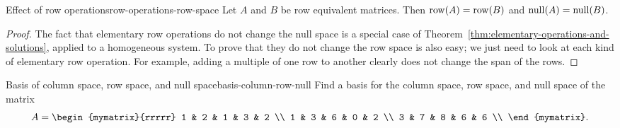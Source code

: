 \begin{proposition}{Effect of row operations}{row-operations-row-space}
  Let $A$ and $B$ be row equivalent matrices. Then $\row(A)=\row(B)$
  and $\nullspace(A)=\nullspace(B)$.
\end{proposition}

\begin{proof}
  The fact that elementary row operations do not change the null space
  is a special case of
  Theorem~\ref{thm:elementary-operations-and-solutions}, applied to a
  homogeneous system. To prove that they do not change the row space
  is also easy; we just need to look at each kind of elementary row
  operation. For example, adding a multiple of one row to another
  clearly does not change the span of the rows.
\end{proof}

\begin{example}{Basis of column space, row space, and null space}{basis-column-row-null}
  Find a basis for the column space, row space, and null space of the
  matrix
  \begin{equation*}
    A =
    \begin{mymatrix}{rrrrr}
      1 & 2 & 1 & 3 & 2 \\
      1 & 3 & 6 & 0 & 2 \\
      3 & 7 & 8 & 6 & 6 \\
    \end{mymatrix}.
  \end{equation*}
\end{example}

